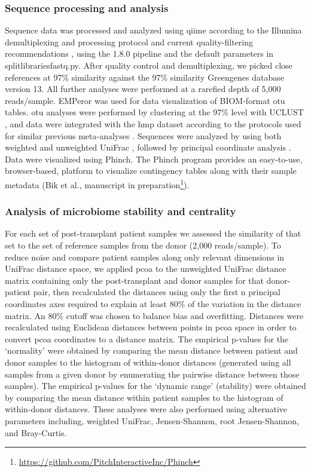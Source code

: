 \subsubsection{Sequence processing and analysis}
Sequence data was processed and analyzed using \gls{qiime} \cite{RN110} according to the Illumina demultiplexing and processing protocol \cite{RN4221} and current quality-filtering recommendations \cite{RN4160}, using the 1.8.0 pipeline and the default parameters in split\textunderscore libraries\textunderscore fastq.py. After quality control and demultiplexing, we picked close references at 97\% similarity against the 97\% similarity Greengenes database \cite{RN165} version 13. All further analyses were performed at a rarefied depth of 5,000 reads/sample.  EMPeror \cite{RN79} was used for data visualization of BIOM-format \cite{RN3811} \gls{otu} tables. \gls{otu} analyses were performed by clustering at the 97\% level with UCLUST \cite{RN81}, and data were integrated with the \gls{hmp} dataset according to the protocols used for similar previous meta-analyses \cite{RN3801, RN82}. Sequences were analyzed by using both weighted and unweighted UniFrac \cite{RN83}, followed by principal coordinate analysis \cite{RN110}. Data were visualized using Phinch.  The Phinch program provides an easy-to-use, browser-based, platform to visualize contingency tables along with their sample metadata (Bik et al., manuscript in preparation\footnote{\url{https://github.com/PitchInteractiveInc/Phinch}}).

\subsubsection{Analysis of microbiome stability and centrality}
For each set of post-transplant patient samples we assessed the similarity of that set to the set of reference samples from the donor (2,000 reads/sample). To reduce noise and compare patient samples along only relevant dimensions in UniFrac distance space, we applied \gls{pcoa} to the unweighted UniFrac distance matrix containing only the post-transplant and donor samples for that donor-patient pair, then recalculated the distances using only the first n principal coordinates axes required to explain at least 80\% of the variation in the distance matrix. An 80\% cutoff was chosen to balance bias and overfitting. Distances were recalculated using Euclidean distances between points in \gls{pcoa} space in order to convert \gls{pcoa} coordinates to a distance matrix. The empirical p-values for the `normality' were obtained by comparing the mean distance between patient and donor samples to the histogram of within-donor distances (generated using all samples from a given donor by enumerating the pairwise distance between those samples). The empirical p-values for the `dynamic range' (stability) were obtained by comparing the mean distance within patient samples to the histogram of within-donor distances. These analyses were also performed using alternative parameters including, weighted UniFrac, Jensen-Shannon, root Jensen-Shannon, and Bray-Curtis.


